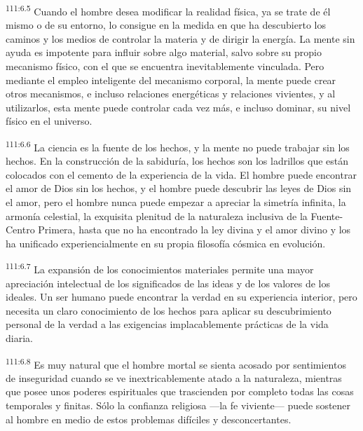 \par
\textsuperscript{111:6.5} Cuando el hombre desea modificar la realidad física, ya se trate de él mismo o de su entorno, lo consigue en la medida en que ha descubierto los caminos y los medios de controlar la materia y de dirigir la energía. La mente sin ayuda es impotente para influir sobre algo material, salvo sobre su propio mecanismo físico, con el que se encuentra inevitablemente vinculada. Pero mediante el empleo inteligente del mecanismo corporal, la mente puede crear otros mecanismos, e incluso relaciones energéticas y relaciones vivientes, y al utilizarlos, esta mente puede controlar cada vez más, e incluso dominar, su nivel físico en el universo.

\par
\textsuperscript{111:6.6} La ciencia es la fuente de los hechos, y la mente no puede trabajar sin los hechos. En la construcción de la sabiduría, los hechos son los ladrillos que están colocados con el cemento de la experiencia de la vida. El hombre puede encontrar el amor de Dios sin los hechos, y el hombre puede descubrir las leyes de Dios sin el amor, pero el hombre nunca puede empezar a apreciar la simetría infinita, la armonía celestial, la exquisita plenitud de la naturaleza inclusiva de la Fuente-Centro Primera, hasta que no ha encontrado la ley divina y el amor divino y los ha unificado experiencialmente en su propia filosofía cósmica en evolución.

\par
\textsuperscript{111:6.7} La expansión de los conocimientos materiales permite una mayor apreciación intelectual de los significados de las ideas y de los valores de los ideales. Un ser humano puede encontrar la verdad en su experiencia interior, pero necesita un claro conocimiento de los hechos para aplicar su descubrimiento personal de la verdad a las exigencias implacablemente prácticas de la vida diaria.

\par
\textsuperscript{111:6.8} Es muy natural que el hombre mortal se sienta acosado por sentimientos de inseguridad cuando se ve inextricablemente atado a la naturaleza, mientras que posee unos poderes espirituales que trascienden por completo todas las cosas temporales y finitas. Sólo la confianza religiosa ---la fe viviente--- puede sostener al hombre en medio de estos problemas difíciles y desconcertantes.

